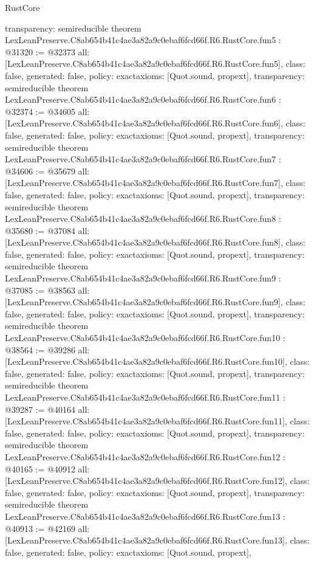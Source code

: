 \begin{lexlean}{RustCore}
\begin{coremodule}
{  transparency: semireducible
}
theorem LexLeanPreserve.C8ab654b41c4ae3a82a9c0ebaf6fcd66f.R6.RustCore.fun5 : @31320 := @32373 {
  all: [LexLeanPreserve.C8ab654b41c4ae3a82a9c0ebaf6fcd66f.R6.RustCore.fun5],
  class: false,
  generated: false,
  policy: exact{axioms: [Quot.sound, propext]},
  transparency: semireducible
}
theorem LexLeanPreserve.C8ab654b41c4ae3a82a9c0ebaf6fcd66f.R6.RustCore.fun6 : @32374 := @34605 {
  all: [LexLeanPreserve.C8ab654b41c4ae3a82a9c0ebaf6fcd66f.R6.RustCore.fun6],
  class: false,
  generated: false,
  policy: exact{axioms: [Quot.sound, propext]},
  transparency: semireducible
}
theorem LexLeanPreserve.C8ab654b41c4ae3a82a9c0ebaf6fcd66f.R6.RustCore.fun7 : @34606 := @35679 {
  all: [LexLeanPreserve.C8ab654b41c4ae3a82a9c0ebaf6fcd66f.R6.RustCore.fun7],
  class: false,
  generated: false,
  policy: exact{axioms: [Quot.sound, propext]},
  transparency: semireducible
}
theorem LexLeanPreserve.C8ab654b41c4ae3a82a9c0ebaf6fcd66f.R6.RustCore.fun8 : @35680 := @37084 {
  all: [LexLeanPreserve.C8ab654b41c4ae3a82a9c0ebaf6fcd66f.R6.RustCore.fun8],
  class: false,
  generated: false,
  policy: exact{axioms: [Quot.sound, propext]},
  transparency: semireducible
}
theorem LexLeanPreserve.C8ab654b41c4ae3a82a9c0ebaf6fcd66f.R6.RustCore.fun9 : @37085 := @38563 {
  all: [LexLeanPreserve.C8ab654b41c4ae3a82a9c0ebaf6fcd66f.R6.RustCore.fun9],
  class: false,
  generated: false,
  policy: exact{axioms: [Quot.sound, propext]},
  transparency: semireducible
}
theorem LexLeanPreserve.C8ab654b41c4ae3a82a9c0ebaf6fcd66f.R6.RustCore.fun10 : @38564 := @39286 {
  all: [LexLeanPreserve.C8ab654b41c4ae3a82a9c0ebaf6fcd66f.R6.RustCore.fun10],
  class: false,
  generated: false,
  policy: exact{axioms: [Quot.sound, propext]},
  transparency: semireducible
}
theorem LexLeanPreserve.C8ab654b41c4ae3a82a9c0ebaf6fcd66f.R6.RustCore.fun11 : @39287 := @40164 {
  all: [LexLeanPreserve.C8ab654b41c4ae3a82a9c0ebaf6fcd66f.R6.RustCore.fun11],
  class: false,
  generated: false,
  policy: exact{axioms: [Quot.sound, propext]},
  transparency: semireducible
}
theorem LexLeanPreserve.C8ab654b41c4ae3a82a9c0ebaf6fcd66f.R6.RustCore.fun12 : @40165 := @40912 {
  all: [LexLeanPreserve.C8ab654b41c4ae3a82a9c0ebaf6fcd66f.R6.RustCore.fun12],
  class: false,
  generated: false,
  policy: exact{axioms: [Quot.sound, propext]},
  transparency: semireducible
}
theorem LexLeanPreserve.C8ab654b41c4ae3a82a9c0ebaf6fcd66f.R6.RustCore.fun13 : @40913 := @42169 {
  all: [LexLeanPreserve.C8ab654b41c4ae3a82a9c0ebaf6fcd66f.R6.RustCore.fun13],
  class: false,
  generated: false,
  policy: exact{axioms: [Quot.sound, propext]},
}
\end{coremodule}
\end{lexlean}

